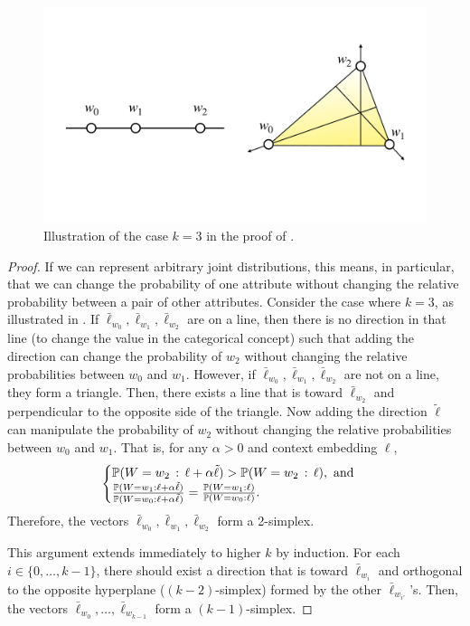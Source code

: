 \documentclass{article}
\begin{document}
\begin{figure}[t]
  \centering
  \includegraphics[trim={4cm 8cm 3cm 5cm}, clip, width=0.8\linewidth]{figures/Theorem.pdf}
  \caption{Illustration of the case $k=3$ in the proof of .}
  \label{fig:proof}
\end{figure}
\begin{proof}
  If we can represent arbitrary joint distributions, this means, in particular, that we can change the probability of one attribute without changing the relative probability between a pair of other attributes.
  Consider the case where $k=3$, as illustrated in .
  If $\bar\ell_{w_0}, \bar\ell_{w_1}, \bar\ell_{w_2}$ are on a line, then there is no direction in that line (to change the value in the categorical concept) such that adding the direction can change the probability of $w_2$ without changing the relative probabilities between $w_0$ and $w_1$.
  However, if $\bar\ell_{w_0}, \bar\ell_{w_1}, \bar\ell_{w_2}$ are not on a line, they form a triangle.
  Then, there exists a line that is toward $\bar\ell_{w_2}$ and perpendicular to the opposite side of the triangle.
  Now adding the direction $\tilde{\ell}$ can manipulate the probability of $w_2$ without changing the relative probabilities between $w_0$ and $w_1$.
  That is, for any $\alpha > 0$ and context embedding $\ell$,
  \begin{equation}
    \begin{cases}
      \Pr(W = w_2 \given \ell + \alpha \tilde{\ell}) > \Pr(W = w_2 \given \ell), \text{ and}\\
      \frac{\Pr(W = w_1 \given \ell + \alpha \tilde{\ell})}{\Pr(W = w_0 \given \ell + \alpha \tilde{\ell})}  = \frac{\Pr(W = w_1 \given \ell )}{\Pr(W = w_0 \given \ell)}.
    \end{cases}
  \end{equation}
  Therefore, the vectors $\bar\ell_{w_0}, \bar\ell_{w_1}, \bar\ell_{w_2}$ form a 2-simplex.
  
  This argument extends immediately to higher $k$ by induction.
  For each $i \in \{0, \dots, k-1\}$, there should exist a direction that is toward $\bar\ell_{w_i}$ and orthogonal to the opposite hyperplane ($(k-2)$-simplex) formed by the other $\bar\ell_{w_{i'}}$'s.
  Then, the vectors $\bar\ell_{w_0}, \dots, \bar\ell_{w_{k-1}}$ form a $(k-1)$-simplex.
\end{proof}
\end{document}

